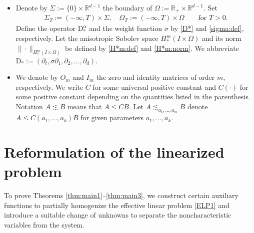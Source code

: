 \documentclass[twoside,11pt]{article}
\numberwithin{equation}{section}
\def\p{\partial}
\begin{document}
\begin{itemize}
		
		\item
		Denote by   $\Sigma:=\{0\}\times\mathbb{R}^{d-1}$
		the boundary of
		$\Omega:=\mathbb{R}_{+}\times \mathbb{R}^{d-1}$.
Set
		\begin{align*}
			\Sigma_T:=(-\infty,T)\times \Sigma,\quad
			\Omega_T :=(-\infty,T)\times \Omega \qquad
			\textrm{for }T>0.
		\end{align*}	
		Define the operator $\mathrm{D}_*^{\alpha}$ and the weight function $\sigma$ by \eqref{D*} and \eqref{sigma:def}, respectively.
		Let the anisotropic Sobolev space $H_*^m(I\times \Omega)$ and its norm
		$\|\cdot \|_{H_*^m(I\times\Omega)}$ be defined by \eqref{H*m:def} and \eqref{H*m:norm}.
		We abbreviate $ \mathrm{D}_*:=(\p_t,\sigma \p_1, \p_2,\ldots,\p_d)$.		
		
\item
We denote by $O_m$ and $I_m$ the zero and identity matrices of order $m$, respectively.
We write $C$ for some universal positive constant
and $C(\cdot)$ for some positive constant depending on the quantities listed in the parenthesis.
Notation $A\lesssim B$ means that $A \leq C B$.
Let $A\lesssim_{a_1,\ldots,a_m} B$ denote $A \leq C(a_1,\ldots,a_k)B$ for given parameters $a_1,\ldots,a_k$.
		
\end{itemize}
	

	


\vspace*{2mm}
	
	\section{Reformulation of the linearized problem}	 \label{sec:refor}
To prove Theorems \ref{thm:main1}--\ref{thm:main3}, we construct certain auxiliary functions to partially homogenize the effective linear problem \eqref{ELP1} and introduce a suitable change of unknowns to separate the noncharacteristic variables from the system.	
\end{document}
